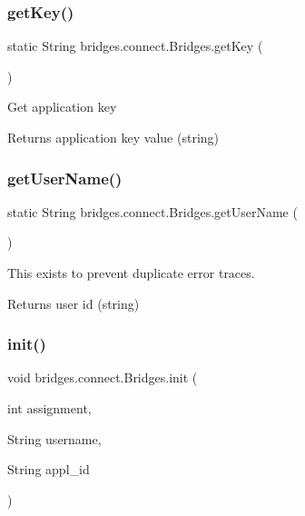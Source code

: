 \subsubsection{\texorpdfstring{get\+Key()}{getKey()}}
{\footnotesize\ttfamily static String bridges.\+connect.\+Bridges.\+get\+Key (\begin{DoxyParamCaption}{ }\end{DoxyParamCaption})\hspace{0.3cm}{\ttfamily [static]}}

Get application key

\begin{DoxyReturn}{Returns}
application key value (string) 
\end{DoxyReturn}
\mbox{\label{classbridges_1_1connect_1_1_bridges_a75f047cda3100e0cfa88378293c12961}} 
\subsubsection{\texorpdfstring{get\+User\+Name()}{getUserName()}}
{\footnotesize\ttfamily static String bridges.\+connect.\+Bridges.\+get\+User\+Name (\begin{DoxyParamCaption}{ }\end{DoxyParamCaption})\hspace{0.3cm}{\ttfamily [static]}}

This exists to prevent duplicate error traces.

\begin{DoxyReturn}{Returns}
user id (string) 
\end{DoxyReturn}
\mbox{\label{classbridges_1_1connect_1_1_bridges_a87aa73367a43cfc8b3ae5e4926ea4895}} 
\subsubsection{\texorpdfstring{init()}{init()}}
{\footnotesize\ttfamily void bridges.\+connect.\+Bridges.\+init (\begin{DoxyParamCaption}\item[{int}]{assignment,  }\item[{String}]{username,  }\item[{String}]{appl\+\_\+id }\end{DoxyParamCaption})}

